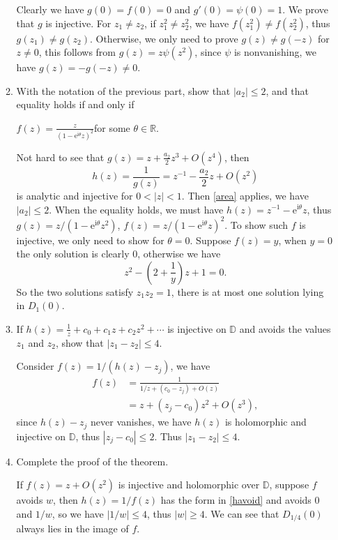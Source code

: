 \documentclass[11pt]{report}
\theoremstyle{mythm}
\let\oldendproof\endproof
\renewenvironment{proof}[1][\proofname]{%
  \oldproof[\normalfont \bfseries #1]%
}{\oldendproof}
\renewcommand*{\proofname}{Proof}
\theoremstyle{myans}
\newcommand{\mi}{\mathrm{i}}
\newcommand{\me}{\mathrm{e}}
\newcommand{\bbD}{\mathbb{D}}
\newcommand{\bbR}{\mathbb{R}}
\begin{document}
\begin{enumerate}
\begin{enumerate}
\begin{proof}
      Clearly we have $g(0) = f(0)=0$ and $g'(0) = \psi(0) = 1$. We prove that $g$ is injective.
      For $z_1 \neq z_2$, if $z_1^2 \neq z_2^2$, we have $f(z_1^2)\neq f(z_2^2)$, thus $g(z_1)\neq g(z_2)$.
      Otherwise, we only need to prove $g(z)\neq g(-z)$ for $z\neq 0$, this follows from
      $g(z) = z \psi(z^2)$, since $\psi$ is nonvanishing, we have $g(z)=-g(-z)\neq 0$.
    \end{proof}
    \item With the notation of the previous
    part, show that $|a_2|\leq 2$, and that equality holds if and only if
    \begin{center}
      $\displaystyle f(z) = \frac{z}{(1-\me^{\mi \theta}z)^2}$\quad for some $\theta\in\bbR$.
    \end{center}
    \begin{proof}
      Not hard to see that $g(z) = z + \frac{a_2}{2}z^3 + O(z^4)$, then
      \[ h(z) = \frac 1{g(z)} = z^{-1} - \frac{a_2}{2}z + O(z^2) \]
      is analytic and injective for $0<|z|<1$. Then \ref{area} applies, we have $|a_2|\leq 2$.
      When the equality holds, we must have $h(z) = z^{-1} - \me^{\mi \theta} z$, thus
      $g(z) = z / (1 - \me^{\mi \theta}z^2)$, $f(z) = z/(1-\me^{\mi\theta} z)^2$.
      To show such $f$ is injective, we only need to show for $\theta=0$.
      Suppose $f(z)=y$, when $y=0$ the only solution is clearly $0$, otherwise we have
      \[ z^2 - \left(2 + \frac 1 y\right)z + 1 = 0. \]
      So the two solutions satisfy $z_1z_2 = 1$, there is at most one solution lying in $D_1(0)$.
    \end{proof}
    \item If $h(z)= \frac1z +c_0 +c_1z+c_2z^2 +\cdots$ is injective on $\bbD$ and avoids the values
    $z_1$ and $z_2$, show that $|z_1-z_2|\leq 4$. \label{havoid}
    \begin{proof}
      Consider $f(z) = 1/(h(z) - z_j)$, we have
      \begin{align*}
        f(z) &= \frac{1}{1/z + (c_0 -z_j) + O(z)}\\
        &= z + (z_j - c_0)z^2 + O(z^3),
      \end{align*}
      since $h(z)-z_j$ never vanishes, we have $h(z)$ is holomorphic and injective on $\bbD$,
      thus $|z_j - c_0|\leq 2$. Thus $|z_1-z_2|\leq 4$.
    \end{proof}
    \item Complete the proof of the theorem.
    \begin{proof}
      If $f(z) = z + O(z^2)$ is injective and holomorphic over $\bbD$,
      suppose $f$ avoids $w$, then $h(z)=1/f(z)$ has the form in \ref{havoid}
      and avoids $0$ and $1/w$, so we have $|1/w|\leq 4$, thus $|w|\geq 4$.
      We can see that $D_{1/4}(0)$ always lies in the image of $f$.


\end{proof}
\end{enumerate}
\end{enumerate}
\end{document}
